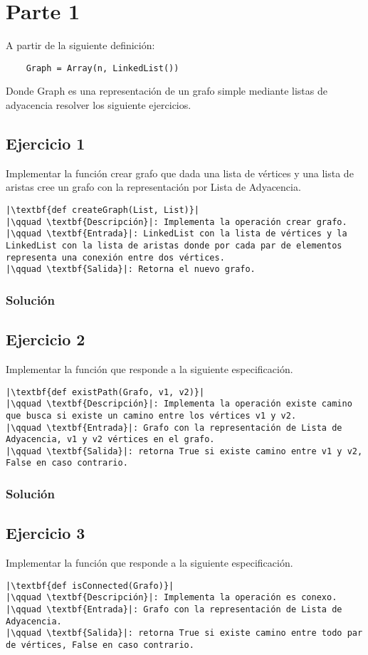 \documentclass{article}
\begin{document}



\section*{Parte 1}
A partir de la siguiente definición:
\begin{lstlisting}
    Graph = Array(n, LinkedList())
\end{lstlisting}
Donde Graph es una representación de un grafo simple mediante listas de adyacencia resolver los siguiente ejercicios.


\subsection*{Ejercicio 1}
Implementar la función crear grafo que dada una lista de vértices y una lista de aristas cree un grafo con la representación por Lista de Adyacencia.
\begin{lstlisting}
|\textbf{def createGraph(List, List)}|
|\qquad \textbf{Descripción}|: Implementa la operación crear grafo.
|\qquad \textbf{Entrada}|: LinkedList con la lista de vértices y la LinkedList con la lista de aristas donde por cada par de elementos representa una conexión entre dos vértices.
|\qquad \textbf{Salida}|: Retorna el nuevo grafo.
\end{lstlisting}
\subsubsection*{Solución}


\subsection*{Ejercicio 2}
Implementar la función que responde a la siguiente especificación.
\begin{lstlisting}
|\textbf{def existPath(Grafo, v1, v2)}|
|\qquad \textbf{Descripción}|: Implementa la operación existe camino que busca si existe un camino entre los vértices v1 y v2.
|\qquad \textbf{Entrada}|: Grafo con la representación de Lista de Adyacencia, v1 y v2 vértices en el grafo.
|\qquad \textbf{Salida}|: retorna True si existe camino entre v1 y v2, False en caso contrario.
\end{lstlisting}
\subsubsection*{Solución}


\subsection*{Ejercicio 3}
Implementar la función que responde a la siguiente especificación.
\begin{lstlisting}
|\textbf{def isConnected(Grafo)}|
|\qquad \textbf{Descripción}|: Implementa la operación es conexo.
|\qquad \textbf{Entrada}|: Grafo con la representación de Lista de Adyacencia.
|\qquad \textbf{Salida}|: retorna True si existe camino entre todo par de vértices, False en caso contrario.
\end{lstlisting}
\end{document}
